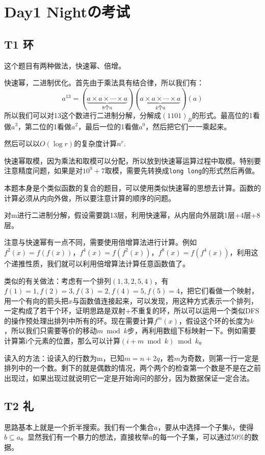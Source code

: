 \section{Day1 Nightの考试}
\subsection{T1 环}
这个题目有两种做法，快速幂、倍增。

快速幂，二进制优化。首先由于乘法具有结合律，所以我们有：
\begin{equation*}
    a^{13}=(\underbrace{a\times a\times\cdots\times a}_{8个a})(\underbrace{a\times a\times\cdots\times a}_{4个a})(a)
\end{equation*}
所以我们可以对13这个数进行二进制分解，分解成$(1101)_B$的形式。最高位的1看做$a^3$，第二位的1看做$a^2$，最后一位的1看做$a^0$，然后把它们一一乘起来。

然后可以以$O(\log r)$的复杂度计算$n^r$.

快速幂取模，因为乘法和取模可以分配，所以放到快速幂运算过程中取模。特别要注意精度问题，如果是对$10^9+7$取模，需要先转换成\verb+long long+的形式然后再做。

本题本身是个类似函数的复合的题目，可以使用类似快速幂的思想去计算。函数的计算必须从内向外做，所以要注意计算的顺序的问题。

对m进行二进制分解，假设需要跳13层，利用快速幂，从内层向外层跳1层+4层+8层。

注意与快速幂有一点不同，需要使用倍增算法进行计算。例如$f^2(x)=f(f(x))$，$f^4(x)=f(f^2(x))$，$f^8(x)=f(f^4(x))$，利用这个递推性质，我们就可以利用倍增算法计算任意函数值了。

类似的有关做法：考虑有一个排列$(1,3,2,5,4)$，有$f(1)=1,f(2)=3,f(3)=2,f(4)=5,f(5)=4$，把它们看做一个映射，用一个有向的箭头把$x$与函数值连接起来，可以发现，用这种方式表示一个排列，一定构成了若干个环，证明思路是双射+不重复的环，所以可以运用一个类似DFS的操作预处理出排列中所有的环。现在需要计算$f^m(x)$，假设这个环的长度为$k$，所以我们只需要等价的移动$m\bmod k$步，再利用数组下标映射一下。例如需要计算第i个元素的位置，那么可以计算$(i+m\bmod k)\bmod k$。

读入的方法：设读入的行数为m，已知$m=n+2q$，若$m$为奇数，则第一行一定是排列中的一个数。剩下的就是偶数的情况，两个两个的检查第一个数是不是在之前出现过，如果出现过就说明它一定是开始询问的部分，因为数据保证一定合法。
\subsection{T2 礼}
思路基本上就是一个折半搜索。我们有一个集合$a$，要从中选择一个子集$b$，使得$b\subseteq a$。显然我们有一个暴力的想法，直接枚举$a$的每一个子集，可以通过50\%的数据。

